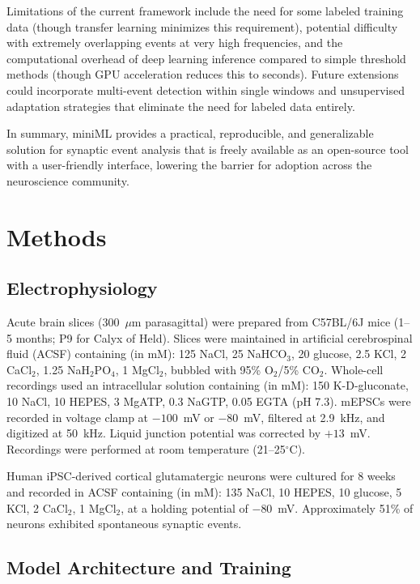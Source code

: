\documentclass[11pt]{article}
\begin{document}
Limitations of the current framework include the need for some labeled training data (though transfer learning minimizes this requirement), potential difficulty with extremely overlapping events at very high frequencies, and the computational overhead of deep learning inference compared to simple threshold methods (though GPU acceleration reduces this to seconds). Future extensions could incorporate multi-event detection within single windows and unsupervised adaptation strategies that eliminate the need for labeled data entirely.

In summary, miniML provides a practical, reproducible, and generalizable solution for synaptic event analysis that is freely available as an open-source tool with a user-friendly interface, lowering the barrier for adoption across the neuroscience community.

\section{Methods}

\subsection{Electrophysiology}

Acute brain slices (300~$\mu$m parasagittal) were prepared from C57BL/6J mice (1--5 months; P9 for Calyx of Held). Slices were maintained in artificial cerebrospinal fluid (ACSF) containing (in mM): 125 NaCl, 25 NaHCO$_3$, 20 glucose, 2.5 KCl, 2 CaCl$_2$, 1.25 NaH$_2$PO$_4$, 1 MgCl$_2$, bubbled with 95\% O$_2$/5\% CO$_2$. Whole-cell recordings used an intracellular solution containing (in mM): 150 K-D-gluconate, 10 NaCl, 10 HEPES, 3 MgATP, 0.3 NaGTP, 0.05 EGTA (pH 7.3). mEPSCs were recorded in voltage clamp at $-100$~mV or $-80$~mV, filtered at 2.9~kHz, and digitized at 50~kHz. Liquid junction potential was corrected by $+13$~mV. Recordings were performed at room temperature (21--25$^{\circ}$C).

Human iPSC-derived cortical glutamatergic neurons were cultured for 8 weeks and recorded in ACSF containing (in mM): 135 NaCl, 10 HEPES, 10 glucose, 5 KCl, 2 CaCl$_2$, 1 MgCl$_2$, at a holding potential of $-80$~mV. Approximately 51\% of neurons exhibited spontaneous synaptic events.

\subsection{Model Architecture and Training}
\end{document}
